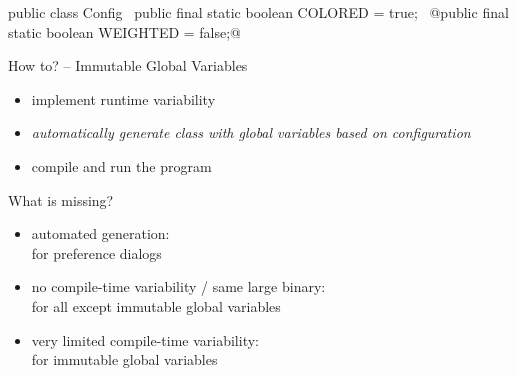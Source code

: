 \begin{frame}[fragile,label=SPLwithImmutableGlobalVariables]{\myframetitle}
	\begin{fancycolumns}[widths={48}]
\begin{codetight}[basicstyle=\small]{}
public class Config {
	~public final static boolean COLORED = true;~
	@public final static boolean WEIGHTED = false;@
}
\end{codetight}
		\begin{definition}{How to? -- Immutable Global Variables}
			\begin{itemize}
				\item implement runtime variability
				\item \emph{automatically generate class with global variables based on configuration}
				\item compile and run the program
			\end{itemize}
		\end{definition}
	\nextcolumn
		\begin{note}{What is missing?}
			\begin{itemize}
				\item automated generation:\\\hfill for preference dialogs
				\item no compile-time variability / same large binary:\\\hfill for all except immutable global variables
				\item very limited compile-time variability:\\\hfill for immutable global variables
			\end{itemize}
		\end{note}
	\end{fancycolumns}
\end{frame}

